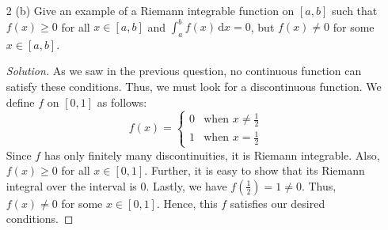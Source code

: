\documentclass[12pt]{article}
\def\D{\mathrm{d}}
\theoremstyle{definition}
\newenvironment{soln}{\begin{proof}[Solution]}{\end{proof}}
\begin{document}
\begin{enumerate}[leftmargin=*]
            
        \medskip
        \hrule
        
        \medskip
        
    
    \textcolor{blue}{\underline{Alternate.} (easier)} 
    
    \begin{soln}
        Consider the trivial partition $P_0 = {a,b}$ of $[a,b]$. Since $f(x) \geq 0$ for all $x \in [a,b]$, we have
        \[
            \inf_{x \in [a,b]} f(x) \geq 0
        \]
        We have
        \[
            L(f, P_0) = \left[ \inf_{x \in [a,b]} f(x) \right] \cdot (b-a) \geq 0
        \]
        and 
        \[
            L(f) \geq L(f, P_0) \geq 0
        \]
        Since $f$ is Riemann integrable, its integral is $L(f)$, which is non-negative, as desired.
        
        \medskip

        For the second part, define $F \colon [a,b] \to \mathbb{R}$ as
        \[
            F(x) = \int_a^x f(t) \, \D t
        \]
        Since $f$ is continuous, we get that $F$ is differentiable with $F^{\prime} = f$, from the Fundamental Theorem of Calculus (Part 1).
        Since $f \geq 0$, we have $F^{\prime} \geq 0$ and hence, $F$ is increasing. This implies that for all $x \in [a,b]$, we have
        \[
            F(a) \leq F(x) \leq F(b)
        \]
        However, since $F(a) = 0 = F(b)$, we get that $F$ is constant and hence, 
        \[
            f(x) = F^{\prime}(x) = 0
        \]
        for all $x \in [a,b]$, as desired.
    \end{soln}
    
    \newpage
    
    \item[2 (b)] Give an example of a Riemann integrable function on $[a,b]$ such that $f(x) \geq 0$ for all $x \in [a,b]$ and $\int_a^b f(x) \, \D x = 0$, but $f(x) \neq 0$ for some $x \in [a,b]$.
    
    \begin{soln}
        As we saw in the previous question, no continuous function can satisfy these conditions. Thus, we must look for a discontinuous function. We define $f$ on $[0,1]$ as follows:
        \[
            f(x) = \begin{cases}
                0 & \text{when $x \neq \frac{1}{2}$} \\
                1 & \text{when $x = \frac{1}{2}$}
            \end{cases}
        \]
        Since $f$ has only finitely many discontinuities, it is Riemann integrable. Also, $f(x) \geq 0$ for all $x \in [0,1]$. Further, it is easy to show that its Riemann integral over the interval is $0$. Lastly, we have $f(\frac{1}{2}) = 1 \neq 0$. Thus, $f(x) \neq 0$ for some $x \in [0,1]$. Hence, this $f$ satisfies our desired conditions.
    \end{soln}
    

\end{enumerate}
\end{document}
